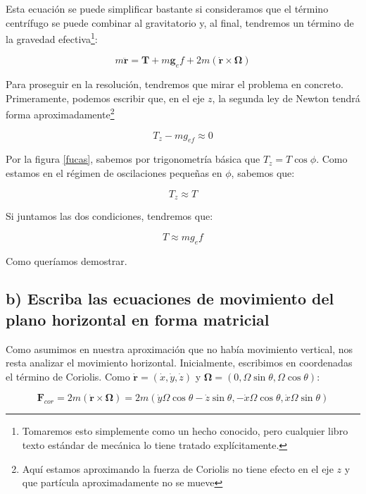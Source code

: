 \documentclass[a4paper,12pt]{article}
\begin{document}
Esta ecuación se puede simplificar bastante si consideramos que el término centrífugo se puede combinar al gravitatorio y, al final, tendremos un término de la gravedad efectiva\footnote{Tomaremos esto simplemente como un hecho conocido, pero cualquier libro texto estándar de mecánica lo tiene tratado explícitamente.}:

\begin{equation}
  \label{initialus1}
  m \ddot{\boldsymbol{r}} = \boldsymbol{T} + m\boldsymbol{g}_ef + 2m (\dot{\boldsymbol{r}} \times \boldsymbol{\Omega})
\end{equation}

Para proseguir en la resolución, tendremos que mirar el problema en concreto. Primeramente, podemos escribir que, en el eje $z$, la segunda ley de Newton tendrá forma aproximadamente\footnote{Aquí estamos aproximando la fuerza de Coriolis no tiene efecto en el eje $z$ y que partícula aproximadamente no se mueve   } 

$$T_{z} - mg_{ef} \approx 0$$

Por la figura \ref{fucas}, sabemos por trigonometría básica que $T_{z} = T \cos{\phi}$. Como estamos en el régimen de oscilaciones pequeñas en $\phi$, sabemos que:

\begin{equation}
  T_{z} \approx T
\end{equation}

Si juntamos las dos condiciones, tendremos que:

\begin{equation}
  T \approx m g_ef 
\end{equation}

Como queríamos demostrar.

\subsection*{b) Escriba las ecuaciones de movimiento del plano horizontal en forma matricial}

Como asumimos en nuestra aproximación que no había movimiento vertical, nos resta analizar el movimiento horizontal. Inicialmente, escribimos en coordenadas el término de Coriolis. Como $\dot{\boldsymbol{r}} = (\dot{x},\dot{y},\dot{z})$ y $\boldsymbol{\Omega} = (0,\Omega \sin\theta, \Omega \cos\theta)$:

$$\boldsymbol{F}_{cor} = 2m (\dot{\boldsymbol{r}} \times \boldsymbol{\Omega}) = 2 m (\dot{y}\Omega \cos\theta-\dot{z} \sin\theta, -\dot{x}\Omega \cos\theta, \dot{x} \Omega \sin\theta )$$
\end{document}
